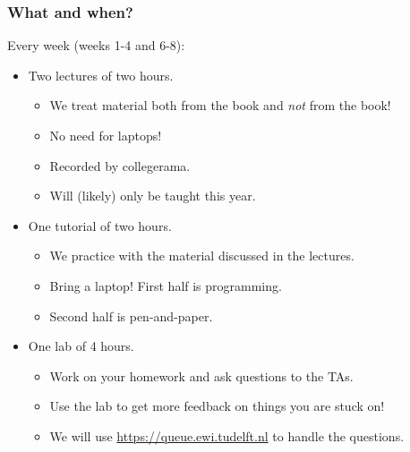 \begin{frame}
	\frametitle{What and when?}

	Every week (weeks 1-4 and 6-8):
	\pause
	\begin{itemize}
		\item Two lectures of two hours. 
			\begin{itemize}
				\item We treat material both from the book and \textit{not} from the book!
			\pause
				\item\alert<2->{ No need for laptops!}
			\pause
				\item Recorded by collegerama.
				\item Will (likely) only be taught this year.
			\end{itemize}
			\pause
		\item One tutorial of two hours.
			\begin{itemize}
				\item We practice with the material discussed in the lectures.
					\pause
				\item Bring a laptop! First half is programming.
				\item Second half is pen-and-paper.
			\end{itemize}
			\pause
		\item One lab of 4 hours.
			\begin{itemize}
				\item Work on your homework and ask questions to the TAs.
				\item Use the lab to get more feedback on things you are stuck on!
					\pause
				\item We will use \url{https://queue.ewi.tudelft.nl} to handle the questions.
			\end{itemize}
	\end{itemize}
\end{frame}


